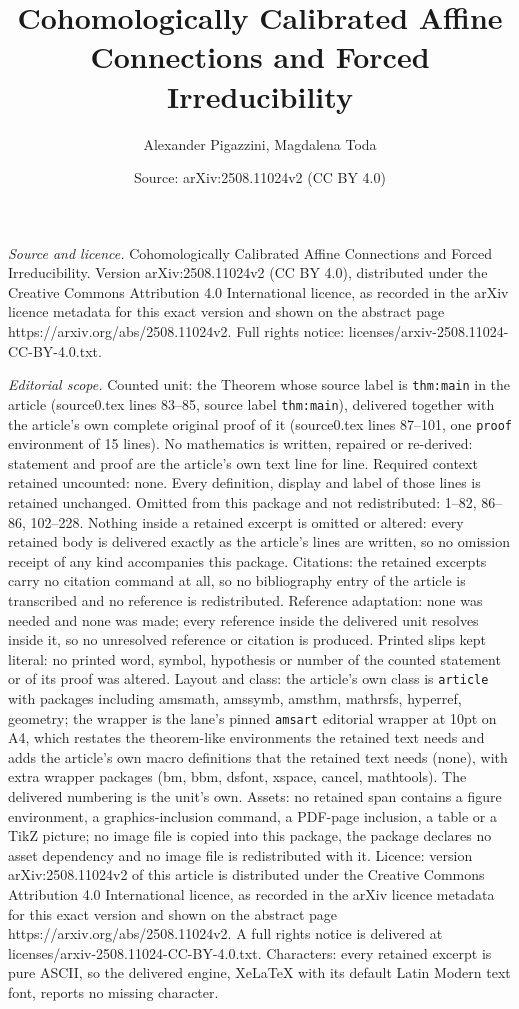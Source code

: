 \documentclass[10pt,a4paper]{amsart}
\title[Cohomologically Calibrated Affine Connections and Forced Irr]{Cohomologically Calibrated Affine Connections and Forced Irreducibility}
\author{Alexander Pigazzini, Magdalena Toda}
\date{Source: arXiv:2508.11024v2 (CC BY 4.0)}
\begin{document}
\maketitle

\noindent\emph{Source and licence.} Cohomologically Calibrated Affine Connections and Forced Irreducibility. Version arXiv:2508.11024v2 (CC BY 4.0), distributed under the Creative Commons Attribution 4.0 International licence, as recorded in the arXiv licence metadata for this exact version and shown on the abstract page https://arxiv.org/abs/2508.11024v2. Full rights notice: licenses/arxiv-2508.11024-CC-BY-4.0.txt.\par\smallskip

\noindent\textit{Editorial scope.} Counted unit: the Theorem whose source label is \texttt{thm:main} in the article (source0.tex lines 83--85, source label \texttt{thm:main}), delivered together with the article's own complete original proof of it (source0.tex lines 87--101, one \texttt{proof} environment of 15 lines). No mathematics is written, repaired or re-derived: statement and proof are the article's own text line for line. Required context retained uncounted: none. Every definition, display and label of those lines is retained unchanged. Omitted from this package and not redistributed: 1--82, 86--86, 102--228. Nothing inside a retained excerpt is omitted or altered: every retained body is delivered exactly as the article's lines are written, so no omission receipt of any kind accompanies this package. Citations: the retained excerpts carry no citation command at all, so no bibliography entry of the article is transcribed and no reference is redistributed. Reference adaptation: none was needed and none was made; every reference inside the delivered unit resolves inside it, so no unresolved reference or citation is produced. Printed slips kept literal: no printed word, symbol, hypothesis or number of the counted statement or of its proof was altered. Layout and class: the article's own class is \texttt{article} with packages including amsmath, amssymb, amsthm, mathrsfs, hyperref, geometry; the wrapper is the lane's pinned \texttt{amsart} editorial wrapper at 10pt on A4, which restates the theorem-like environments the retained text needs and adds the article's own macro definitions that the retained text needs (none), with extra wrapper packages (bm, bbm, dsfont, xspace, cancel, mathtools). The delivered numbering is the unit's own. Assets: no retained span contains a figure environment, a graphics-inclusion command, a PDF-page inclusion, a table or a TikZ picture; no image file is copied into this package, the package declares no asset dependency and no image file is redistributed with it. Licence: version arXiv:2508.11024v2 of this article is distributed under the Creative Commons Attribution 4.0 International licence, as recorded in the arXiv licence metadata for this exact version and shown on the abstract page https://arxiv.org/abs/2508.11024v2. A full rights notice is delivered at licenses/arxiv-2508.11024-CC-BY-4.0.txt. Characters: every retained excerpt is pure ASCII, so the delivered engine, XeLaTeX with its default Latin Modern text font, reports no missing character.
\end{document}
